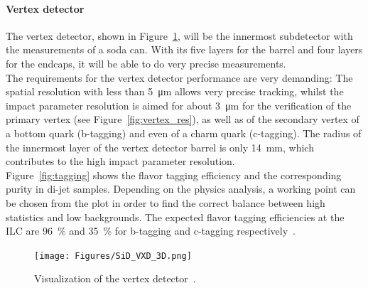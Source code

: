 \paragraph{Vertex detector}
The vertex detector, shown in Figure~\ref{fig:SiD_VXD}, will be the innermost subdetector with the measurements of a soda can.
With its five layers for the barrel and four layers for the endcaps, it will be able to do very precise measurements.
\\The requirements for the vertex detector performance are very demanding:
The spatial resolution with less than \SI{5}{\micro\meter} allows very precise tracking, whilst the impact parameter resolution is aimed for about \SI{3}{\micro\meter} for the verification of the primary vertex (see Figure~\ref{fig:vertex_res}), as well as of the secondary vertex of a bottom quark (b-tagging) and even of a charm quark (c-tagging).
The radius of the innermost layer of the vertex detector barrel is only \SI{14}{\milli\meter}, which contributes to the high impact parameter resolution.
\\Figure~\ref{fig:tagging} shows the flavor tagging efficiency and the corresponding purity in di-jet samples.
Depending on the physics analysis, a working point can be chosen from the plot in order to find the correct balance between high statistics and low backgrounds.
The expected flavor tagging efficiencies at the ILC are \SI{96}{\percent} and \SI{35}{\percent} for b-tagging and c-tagging respectively~\cite[p. 54]{TDR2}.
\begin{figure}[h!]
\centering
\texttt{[image: Figures/SiD\_VXD\_3D.png]}
\caption[Visualization of the \sid vertex detector]{Visualization of the \sid vertex detector~\cite{SiD_Update2}.}
\label{fig:SiD_VXD}
\end{figure}


